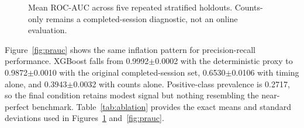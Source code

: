 \documentclass[conference, letterpaper]{IEEEtran}
\begin{document}
\begin{figure}[t]
\centering
{}
\caption{Mean ROC-AUC across five repeated stratified holdouts. Counts-only remains a completed-session diagnostic, not an online evaluation.}
\label{fig:auc}
\end{figure}

Figure~\ref{fig:prauc} shows the same inflation pattern for precision-recall performance. XGBoost falls from 0.9992$\pm$0.0002 with the deterministic proxy to 0.9872$\pm$0.0010 with the original completed-session set, 0.6530$\pm$0.0106 with timing alone, and 0.3943$\pm$0.0032 with counts alone. Positive-class prevalence is 0.2717, so the final condition retains modest signal but nothing resembling the near-perfect benchmark. Table~\ref{tab:ablation} provides the exact means and standard deviations used in Figures~\ref{fig:auc} and~\ref{fig:prauc}.
\end{document}
